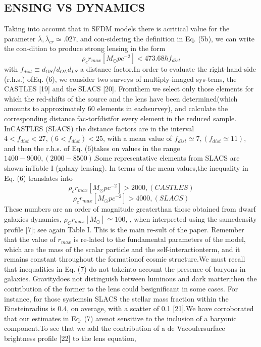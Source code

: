\documentclass{article}\newcommand\Star[1]{#1\textsuperscript{*}}
\begin{document}
\begin{multicols}{2}
  \section{ENSING VS DYNAMICS}
Taking into account that in SFDM models there is acritical value for the parameter \(\bar{\lambda} , \bar{\lambda}_{cr} \simeq .027\), and con-sidering the definition in Eq. (5b), we can write the con-dition to produce strong lensing in the form \\
\begin{equation}\tag{6}
	\rho_{c} r_{max}[M_{\odot}pc^{-2}]  < 473.68 \hbar f_{dist}
\end{equation}
with \(f_{dist}\equiv d_{OS}/d_{OL}d_{LS}\) a distance factor.In  order  to  evaluate  the  right-hand-side  (r.h.s.)    ofEq. (6), we consider two surveys of multiply-imaged sys-tems,  the  CASTLES  [19]  and  the  SLACS  [20].   Fromthem  we  select  only  those  elements  for  which  the  red-shifts  of  the  source  and  the  lens  have  been  determined(which  amounts  to  approximately  60  elements  in  eachsurvey),  and  calculate  the  corresponding  distance  fac-torfdistfor  every  element  in  the  reduced  sample.   InCASTLES (SLACS) the distance factors are in the interval  \(4<f_{dist}<27, (6<f_{dist})<25\), with a mean value of \(f_{dist}\simeq 7, (f_{dist}\simeq 11)\), and then the r.h.s.  of Eq. (6)takes on values in the range \(1400-9000, (2000-8500)\).Some representative elements from SLACS are shown inTable  I  (galaxy  lensing).   In  terms  of  the  mean  values,the inequality in Eq. (6) translates into
 \begin{equation}\tag{7a}
 	\rho_{c}r_{max}[M_{\odot}pc^{-2}]>2000, (CASTLES)
 \end{equation}
  \begin{equation}\tag{7b}
 	\rho_{c}r_{max}[M_{\odot}pc^{-2}]>4000, (SLACS)
 \end{equation}
These  numbers  are  an  order  of  magnitude  greaterthan   those   obtained   from   dwarf   galaxies   dynamics, \(\rho_{C}r_{max}[M_{\odot}]\simeq 100\), , when interpreted using the samedensity profile [7]; see again Table I. This is the main re-sult of the paper.  Remember that the value of \(r_{max}\) is re-lated to the fundamental parameters of the model, which are the mass of the scalar particle and the self-interactionterm, and it remains constant throughout the formationof cosmic structure.We must recall that inequalities in Eq.  (7) do not takeinto account the presence of baryons in galaxies.  Gravitydoes not distinguish between luminous and dark matter;then the contribution of the former to the lens could besignificant in some cases.  For instance, for those systemsin SLACS the stellar mass fraction within the Einsteinradius is 0.4, on average, with a scatter of 0.1 [21].We have corroborated that our estimates in Eq. (7) arenot sensitive to the inclusion of a baryonic component.To  see  that  we  add  the  contribution  of  a  de  Vacoulersurface brightness profile [22] to the lens equation,

\end{multicols}
\end{document}
